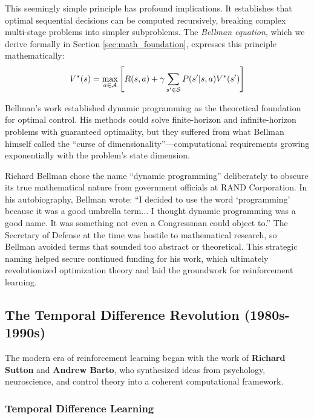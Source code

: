 This seemingly simple principle has profound implications. It establishes that optimal sequential decisions can be computed recursively, breaking complex multi-stage problems into simpler subproblems. The \textit{Bellman equation}, which we derive formally in Section \ref{sec:math_foundation}, expresses this principle mathematically:
\begin{equation}
V^*(s) = \max_{a \in \mathcal{A}} \left[ R(s,a) + \gamma \sum_{s' \in \mathcal{S}} P(s'|s,a) V^*(s') \right]
\label{eq:bellman_preview}
\end{equation}

Bellman's work established dynamic programming as the theoretical foundation for optimal control. His methods could solve finite-horizon and infinite-horizon problems with guaranteed optimality, but they suffered from what Bellman himself called the ``curse of dimensionality''---computational requirements growing exponentially with the problem's state dimension.

\begin{historicalbox}
Richard Bellman chose the name ``dynamic programming'' deliberately to obscure its true mathematical nature from government officials at RAND Corporation. In his autobiography, Bellman wrote: ``I decided to use the word `programming' because it was a good umbrella term... I thought dynamic programming was a good name. It was something not even a Congressman could object to.'' The Secretary of Defense at the time was hostile to mathematical research, so Bellman avoided terms that sounded too abstract or theoretical. This strategic naming helped secure continued funding for his work, which ultimately revolutionized optimization theory and laid the groundwork for reinforcement learning.
\end{historicalbox}

\subsection{The Temporal Difference Revolution (1980s-1990s)}

The modern era of reinforcement learning began with the work of \textbf{Richard Sutton} and \textbf{Andrew Barto}, who synthesized ideas from psychology, neuroscience, and control theory into a coherent computational framework.

\subsubsection{Temporal Difference Learning}

